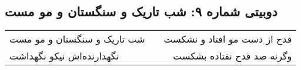 \begin{center}
\section*{دوبیتی شماره ۹: شب تاریک و سنگستان و مو مست}
\label{sec:009}
\begin{longtable}{l p{0.5cm} r}
شب تاریک و سنگستان و مو مست
&&
قدح از دست مو افتاد و نشکست
\\
نگهدارنده‌اش نیکو نگهداشت
&&
وگرنه صد قدح نفتاده بشکست
\\
\end{longtable}
\end{center}
